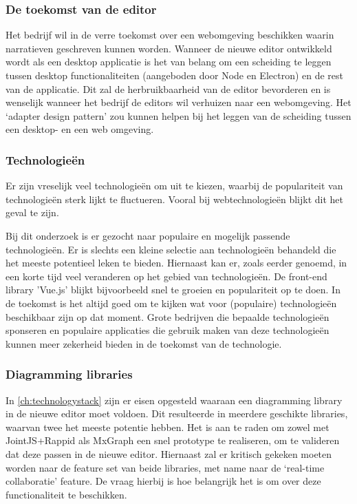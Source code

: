 \subsubsection{De toekomst van de editor}
Het bedrijf wil in de verre toekomst over een webomgeving beschikken waarin narratieven geschreven kunnen worden. Wanneer de nieuwe editor ontwikkeld wordt als een desktop applicatie is het van belang om een scheiding te leggen tussen desktop functionaliteiten (aangeboden door Node en Electron) en de rest van de applicatie. Dit zal de herbruikbaarheid van de editor bevorderen en is wenselijk wanneer het bedrijf de editors wil verhuizen naar een webomgeving. Het ‘adapter design pattern’ zou kunnen helpen bij het leggen van de scheiding tussen een desktop- en een web omgeving.

\subsubsection{Technologieën}
Er zijn vreselijk veel technologieën om uit te kiezen, waarbij de populariteit van technologieën sterk lijkt te fluctueren. Vooral bij webtechnologieën blijkt dit het geval te zijn.

Bij dit onderzoek is er gezocht naar populaire en mogelijk passende technologieën. Er is slechts een kleine selectie aan technologieën behandeld die het meeste potentieel leken te bieden. Hiernaast kan er, zoals eerder genoemd, in een korte tijd veel veranderen op het gebied van technologieën. De front-end library 'Vue.js' blijkt bijvoorbeeld snel te groeien en populariteit op te doen. In de toekomst is het altijd goed om te kijken wat voor (populaire) technologieën beschikbaar zijn op dat moment. Grote bedrijven die bepaalde technologieën sponseren en populaire applicaties die gebruik maken van deze technologieën kunnen meer zekerheid bieden in de toekomst van de technologie.

\subsubsection{Diagramming libraries}
In \autoref{ch:technologystack} zijn er eisen opgesteld waaraan een diagramming library in de nieuwe editor moet voldoen. Dit resulteerde in meerdere geschikte libraries, waarvan twee het meeste potentie hebben. Het is aan te raden om zowel met JointJS+Rappid als MxGraph een snel prototype te realiseren, om te valideren dat deze passen in de nieuwe editor. Hiernaast zal er kritisch gekeken moeten worden naar de feature set van beide libraries, met name naar de ‘real-time collaboratie’ feature. De vraag hierbij is hoe belangrijk het is om over deze functionaliteit te beschikken.


